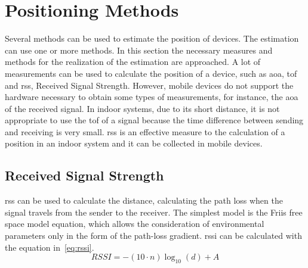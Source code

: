 \begin{table}[!htb]
  \renewcommand{\arraystretch}{2} %
  \centering
  \caption[Technologies' Differences]{Technologies' Differences.}
  \label{tab:technodif}
\end{table}

\section{Positioning Methods}
\label{section:methods}
Several methods can be used to estimate the position of devices. The estimation can use one or more methods. In this section the necessary measures and methods for the realization of the estimation are approached.
A lot of measurements can be used to calculate the position of a device, such as \gls{aoa}, \gls{tof} and \gls{rss}, Received Signal Strength. However, mobile devices do not support the hardware necessary to obtain some types of measurements, for instance, the \gls{aoa} of the received signal. In indoor systems, due to its short distance, it is not appropriate to use the \gls{tof} of a signal because the time difference between sending and receiving is very small. 
\gls{rss} is an effective measure to the calculation of a position in an indoor system and it can be collected in mobile devices.


\subsection{Received Signal Strength}
\label{subsection:receivedsignal}
\gls{rss} can be used to calculate the distance, calculating the path loss when the signal travels from the sender to the receiver. The simplest model is the Friis free space model equation, which allows the consideration of environmental parameters only in the form of the path-loss gradient. \gls{rssi} can be calculated with the equation in~\ref{eq:rssi}.
\begin{equation}
\label{eq:rssi}
RSSI = -(10\cdot n)\log_{10}(d) +A
\end{equation}

